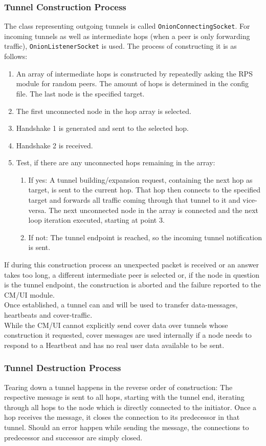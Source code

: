 \documentclass{article}
\begin{document}
	\subsubsection{Tunnel Construction Process}
	The class representing outgoing tunnels is called \texttt{OnionConnectingSocket}. For incoming tunnels as well as intermediate hops (when a peer is only forwarding traffic), \texttt{OnionListenerSocket} is used. The process of constructing it is as follows:
	\begin{enumerate}
		\item An array of intermediate hops is constructed by repeatedly asking the RPS module for random peers. The amount of hops is determined in the config file. The last node is the specified target.
		\item The first unconnected node in the hop array is selected.
		\item Handshake 1 is generated and sent to the selected hop.
		\item Handshake 2 is received.
		\item Test, if there are any unconnected hops remaining in the array: 
		\begin{enumerate}
			\item If yes: A tunnel building/expansion request, containing the next hop as target, is sent to the current hop. That hop then connects to the specified target and forwards all traffic coming through that tunnel to it and vice-versa. The next unconnected node in the array is connected and the next loop iteration executed, starting at point 3.
			\item If not: The tunnel endpoint is reached, so the incoming tunnel notification is sent.
		\end{enumerate}
	\end{enumerate}
	If during this construction process an unexpected packet is received or an answer takes too long, a different intermediate peer is selected or, if the node in question is the tunnel endpoint, the construction is aborted and the failure reported to the CM/UI module. \\	
	Once established, a tunnel can and will be used to transfer data-messages, heartbeats and cover-traffic. \\	
	While the CM/UI cannot explicitly send cover data over tunnels whose construction it requested, cover messages are used internally if a node needs to respond to a Heartbeat and has no real user data available to be sent.
	
	\subsubsection{Tunnel Destruction Process}
	Tearing down a tunnel happens in the reverse order of construction: The respective message is sent to all hops, starting with the tunnel end, iterating through all hops to the node which is directly connected to the initiator. Once a hop receives the message, it closes the connection to its predecessor in that tunnel. Should an error happen while sending the message, the connections to predecessor and successor are simply closed.
	
\end{document}
